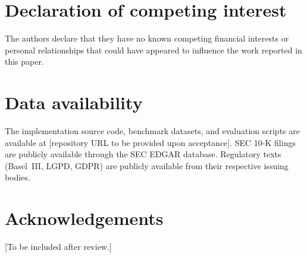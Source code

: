 \documentclass[review]{elsarticle}
\begin{document}
\section*{Declaration of competing interest}
The authors declare that they have no known competing financial interests or personal relationships that could have appeared to influence the work reported in this paper.

\section*{Data availability}
The implementation source code, benchmark datasets, and evaluation scripts are available at [repository URL to be provided upon acceptance]. SEC 10-K filings are publicly available through the SEC EDGAR database. Regulatory texts (Basel~III, LGPD, GDPR) are publicly available from their respective issuing bodies.

\section*{Acknowledgements}
[To be included after review.]



\end{document}

